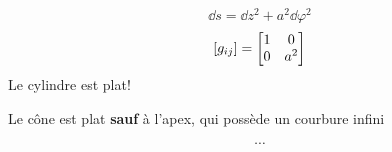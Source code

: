  
\begin{tcolorbox}[title=Exemple 2: le cylindre de rayon a]
	 $$\dd s = \dd z^{2}+ a^{2}\dd \varphi^2$$ 
	 $$[g_{ij} ] = \mqty[1 &0 \\ 0 & a^2]$$ 
	 Le cylindre est plat!
\end{tcolorbox}

\begin{tcolorbox}[title=Exemple 3: le cône]
	Le cône est plat \textbf{sauf} à l'apex, qui possède un courbure infini

\end{tcolorbox}

\begin{tcolorbox}[title=Exemple 4: tore plongé dans $\mathds{R}^{3} $ ]
	$$\dotsb$$  
\end{tcolorbox}




